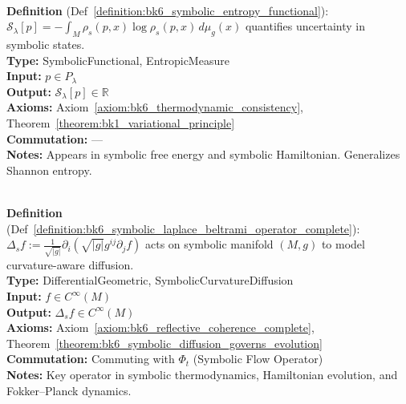 \begin{description}[leftmargin=2.5cm, style=nextline]
\item[\textbf{Symbolic Entropy Operator/Functional} \hfill \ensuremath{\mathcal{S}_{\lambda}[p]}] \leavevmode\\
\textbf{Definition} (Def~\ref{definition:bk6_symbolic_entropy_functional}): \( \mathcal{S}_{\lambda}[p] = -\int_M \rho_s(p,x) \log \rho_s(p,x) \, d\mu_g(x) \) quantifies uncertainty in symbolic states.\\
\textbf{Type:} SymbolicFunctional, EntropicMeasure\\
\textbf{Input:} \( p \in P_\lambda \)\\
\textbf{Output:} \( \mathcal{S}_{\lambda}[p] \in \mathbb{R} \)\\
\textbf{Axioms:} Axiom~\ref{axiom:bk6_thermodynamic_consistency}, Theorem~\ref{theorem:bk1_variational_principle}\\
\textbf{Commutation:} ---\\
\textbf{Notes:} Appears in symbolic free energy and symbolic Hamiltonian. Generalizes Shannon entropy.

\item[\textbf{Symbolic Laplace--Beltrami Operator} \hfill \ensuremath{\Delta_s}] \leavevmode\\
\textbf{Definition} (Def~\ref{definition:bk6_symbolic_laplace_beltrami_operator_complete}): \( \Delta_s f := \frac{1}{\sqrt{|g|}} \partial_i (\sqrt{|g|} g^{ij} \partial_j f) \) acts on symbolic manifold \( (M, g) \) to model curvature-aware diffusion.\\
\textbf{Type:} DifferentialGeometric, SymbolicCurvatureDiffusion\\
\textbf{Input:} \( f \in C^{\infty}(M) \)\\
\textbf{Output:} \( \Delta_s f \in C^{\infty}(M) \)\\
\textbf{Axioms:} Axiom~\ref{axiom:bk6_reflective_coherence_complete}, Theorem~\ref{theorem:bk6_symbolic_diffusion_governs_evolution}\\
\textbf{Commutation:} Commuting with \( \Phi_t \) (Symbolic Flow Operator)\\
\textbf{Notes:} Key operator in symbolic thermodynamics, Hamiltonian evolution, and Fokker–Planck dynamics.


\end{description}
